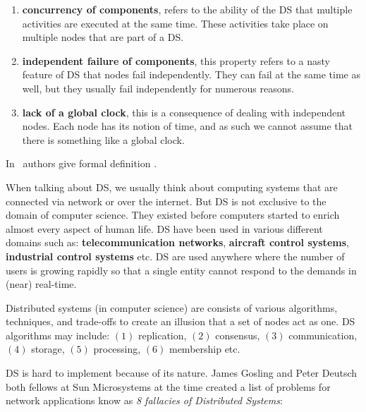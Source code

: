 \begin{enumerate}[start=1,label={(\bfseries \arabic*)}]
	\item \textbf{concurrency of components}, refers to the ability of the DS that multiple activities are executed at the same time. These activities take place on multiple nodes that are part of a DS.
	\item \textbf{independent failure of components}, this property refers to a nasty feature of DS that nodes fail independently. They can fail at the same time as well, but they usually fail independently for numerous reasons.
	\item \textbf{lack of a global clock}, this is a consequence of dealing with independent nodes. Each node has its notion of time, and as such we cannot assume that there is something like a global clock.
\end{enumerate} 

In~\cite{SteenT16} authors give formal definition .

When talking about DS, we usually think about computing systems that are connected via network or over the internet. But DS is not exclusive to the domain of computer science. They existed before computers started to enrich almost every aspect of human life. DS have been used in various different domains such as: \textbf{telecommunication networks}, \textbf{aircraft control systems}, \textbf{industrial control systems} etc. DS are used anywhere where the number of users is growing rapidly so that a single entity cannot respond to the demands in (near) real-time.

Distributed systems (in computer science) are consists of various algorithms, techniques, and trade-offs to create an illusion that a set of nodes act as one. DS algorithms may include: $(1)$ replication, $(2)$ consensus, $(3)$ communication, $(4)$ storage, $(5)$ processing, $(6)$ membership etc.

DS is hard to implement because of its nature. James Gosling and Peter Deutsch both fellows at Sun Microsystems at the time created a list of problems for network applications know as \textit{8 fallacies of Distributed Systems}:\label{enum:fallacies}

